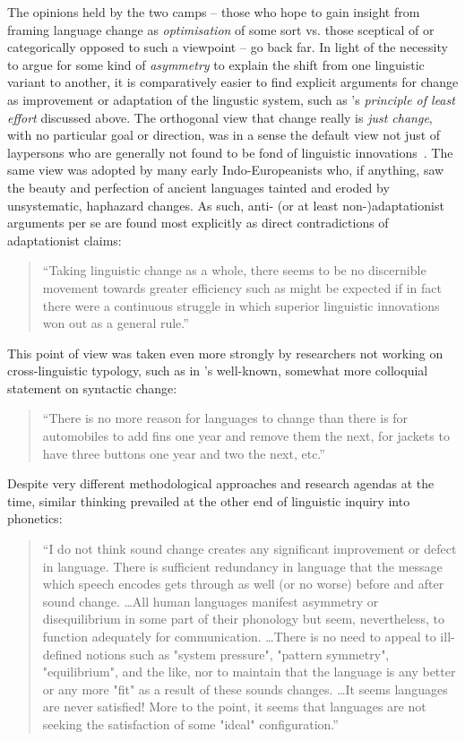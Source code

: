 The opinions held by the two camps -- those who hope to gain insight from framing language change as \emph{optimisation} of some sort vs. those sceptical of or categorically opposed to such a viewpoint -- go back far.
In light of the necessity to argue for some kind of \emph{asymmetry} to explain the shift from one linguistic variant to another, it is comparatively easier to find explicit arguments for change as improvement or adaptation of the lingustic system, such as \citet{Zipf1949}'s \emph{principle of least effort} discussed above.
The orthogonal view that change really is \emph{just change}, with no particular goal or direction, was in a sense the default view not just of laypersons who are generally not found to be fond of linguistic innovations~\citep{Labov2001}. The same view was adopted by many early Indo-Europeanists who, if anything, saw the beauty and perfection of ancient languages tainted and eroded by unsystematic, haphazard changes. As such, anti- (or at least non-)adaptationist arguments per se are found most explicitly as direct contradictions of adaptationist claims:

\begin{quote}
``Taking linguistic change as a whole, there seems to be no discernible movement towards greater efficiency such as might be expected if in fact there were a continuous struggle in which superior linguistic innovations won out as a general rule.''~\citep[p.69]{Greenberg1959}
\end{quote}

This point of view was taken even more strongly by researchers not working on cross-linguistic typology, such as in \citeauthor{Postal1968}'s well-known, somewhat more colloquial statement on syntactic change:

\begin{quote}
``There is no more reason for languages to change than there is for automobiles to add fins one year and remove them the next, for jackets to have three buttons one year and two the next, etc.''~\citep[p.283]{Postal1968}
\end{quote}

Despite very different methodological approaches and research agendas at the time, similar thinking prevailed at the other end of linguistic inquiry into phonetics:

\begin{quote}
``I do not think sound change creates any significant improvement or defect in language. There is sufficient redundancy in language that the message which speech encodes gets through as well (or no worse) before and after sound change. \ldots All human languages manifest asymmetry or disequilibrium in some part of their phonology but seem, nevertheless, to function adequately for communication. \ldots There is no need to appeal to ill-defined notions such as "system pressure", "pattern symmetry", "equilibrium", and the like, nor to maintain that the language is any better or any more "fit" as a result of these sounds changes. \ldots It seems languages are never satisfied! More to the point, it seems that languages are not seeking the satisfaction of some "ideal" configuration.''~\citep[p.191-192]{Ohala1989}
\end{quote}

